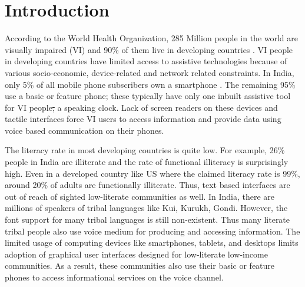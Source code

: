 \documentclass{sigchi}
\providecommand{\DIFaddtex}[1]{{\protect\color{blue}\uwave{#1}}} %
\providecommand{\DIFdeltex}[1]{{\protect\color{red}\sout{#1}}}                      %
\providecommand{\DIFaddbegin}{} %
\providecommand{\DIFaddend}{} %
\providecommand{\DIFdelbegin}{} %
\providecommand{\DIFdelend}{} %
\providecommand{\DIFadd}[1]{\texorpdfstring{\DIFaddtex{#1}}{#1}} %
\providecommand{\DIFdel}[1]{\texorpdfstring{\DIFdeltex{#1}}{}} %
\begin{document}
\DIFaddbegin 

\section{Introduction}
According to the World Health Organization, 285 Million people in the world are visually impaired (VI) and 90\% of them live in developing countries \cite{WHO2013}. VI people in developing countries have limited access to assistive technologies because of various socio-economic, device-related and network related constraints. In India, only
5\% of all mobile phone subscribers own a smartphone \cite{Mary2013}. The remaining 95\% use a basic or feature phone; these typically have only one inbuilt assistive tool for VI people\DIFdelbegin \DIFdel{, }\DIFdelend \DIFaddbegin \DIFadd{: }\DIFaddend a speaking clock. Lack of screen readers on these devices and tactile interfaces force VI users to access information and provide data using voice based communication on their phones. 

The literacy rate in most developing countries is quite low. For example, 26\% people in India are illiterate and the rate of functional illiteracy is surprisingly high. Even in a developed country like US where the claimed literacy rate is 99\%, around 20\% of adults are functionally illiterate. Thus, text based interfaces are out of reach of sighted low-literate communities as well. In India, there are millions of speakers of tribal languages like Kui, Kurukh, Gondi. However, the font support for many tribal languages is still non-existent. Thus many literate tribal people also use voice medium for producing and accessing information. The limited usage of computing devices like smartphones, tablets, and desktops limits adoption of graphical user interfaces designed for low-literate low-income communities. As a result, these communities also use their basic or feature phones to access informational services on the voice channel.
\end{document}
